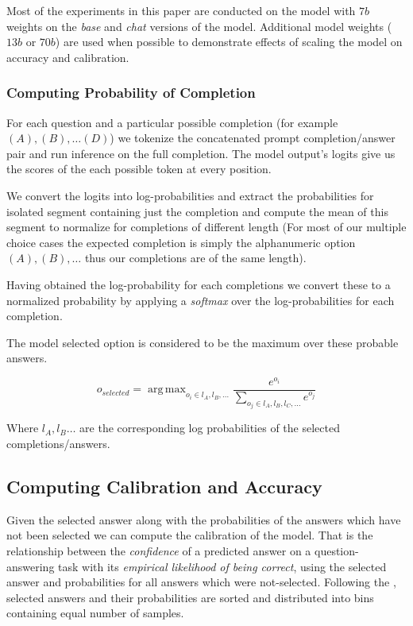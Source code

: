 \documentclass[11pt]{article}
\DeclareMathOperator*{\argmax}{arg\,max}
\begin{document}
Most of the experiments in this paper are conducted on the model 
with $7b$ weights on the \emph{base} and \emph{chat} versions of 
the model. Additional model weights ($13b$ or $70b$) 
are used when possible to demonstrate effects of scaling the model on accuracy and calibration.

\subsubsection{Computing Probability of Completion}

For each question and a particular possible completion 
(for example $(A), (B), \dots (D)$)  we tokenize the concatenated 
prompt completion/answer pair and run inference on the full completion. 
The model output's logits give us the scores of the each 
possible token at every position. 

We convert the logits into log-probabilities and extract the probabilities for 
isolated segment containing just the completion and compute the mean of this segment to 
normalize for completions of different length (For most of our multiple choice cases 
the expected completion is simply the alphanumeric option $(A), (B), \dots $ 
thus our completions are of the same length).

Having obtained the log-probability for each completions we convert these to 
a normalized probability by applying a \emph{softmax} over the log-probabilities 
for each completion. 

The model selected option is considered to be the maximum over 
these probable answers. 

\begin{equation}
    o_{selected} = \argmax_{o_i \in l_A, l_B, \dots}  
    \frac{e^{o_i}}{\sum_{o_j \in l_A, l_B, l_C, \dots} e^{o_j}} 
\end{equation}

Where $l_A, l_B\dots$ are the corresponding log probabilities of the selected completions/answers.

\subsection{Computing Calibration and Accuracy}

Given the selected answer along with the probabilities 
of the answers which have not been selected we can 
compute the calibration of the model.  That is the relationship 
between the \emph{confidence} of a predicted answer on a 
question-answering task with its \emph{empirical likelihood of being correct}, 
using the selected answer and probabilities for all answers which were not-selected. 
Following the \cite{kadavath2022language}, selected answers and their 
probabilities are sorted and distributed into bins containing equal number of samples.
\end{document}
